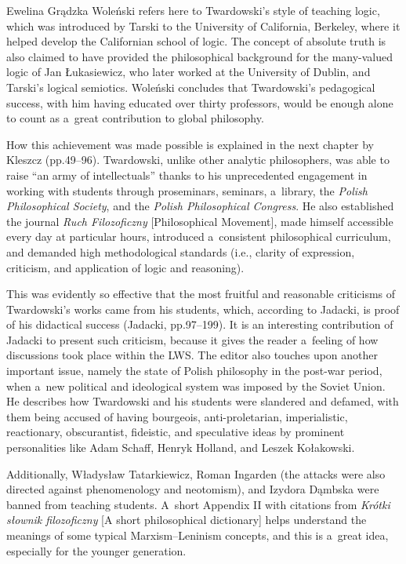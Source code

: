 \begin{newrevengenv}{Ewelina Grądzka}
Woleński refers here to Twardowski's style of teaching logic, which was introduced by Tarski to the University of California, Berkeley, where it helped develop the Californian school of logic. The concept of absolute truth is also claimed to have provided the philosophical background for the many-valued logic of Jan Łukasiewicz, who later worked at the University of Dublin, and Tarski's logical semiotics. Woleński concludes that Twardowski's pedagogical success, with him having educated over thirty professors, would be enough alone to count as a~great contribution to global philosophy.

How this achievement was made possible is explained in the next chapter by Kleszcz (pp.49–96). Twardowski, unlike other analytic philosophers, was able to raise ``an army of intellectuals'' thanks to his unprecedented engagement in working with students through proseminars, seminars, a~library, the \textit{Polish Philosophical Society}, and the \textit{Polish Philosophical Congress}. He also established the journal \textit{Ruch Filozoficzny} [Philosophical Movement], made himself accessible every day at particular hours, introduced a~consistent philosophical curriculum, and demanded high methodological standards (i.e., clarity of expression, criticism, and application of logic and reasoning).

This was evidently so effective that the most fruitful and reasonable criticisms of Twardowski's works came from his students, which, according to Jadacki, is proof of his didactical success (Jadacki, pp.97–199). It is an interesting contribution of Jadacki to present such criticism, because it gives the reader a~feeling of how discussions took place within the LWS. The editor also touches upon another important issue, namely the state of Polish philosophy in the post-war period, when a~new political and ideological system was imposed by the Soviet Union. He describes how Twardowski and his students were slandered and defamed, with them being accused of having bourgeois, anti-proletarian, imperialistic, reactionary, obscurantist, fideistic, and speculative ideas by prominent personalities like Adam Schaff, Henryk Holland, and Leszek Kołakowski.

Additionally, Władysław Tatarkiewicz, Roman Ingarden (the attacks were also directed against phenomenology and neotomism), and Izydora Dąmbska were banned from teaching students. A~short Appendix II with citations from \textit{Krótki słownik filozoficzny} [A short philosophical dictionary] helps understand the meanings of some typical Marxism–Leninism concepts, and this is a~great idea, especially for the younger generation.


\end{newrevengenv}

